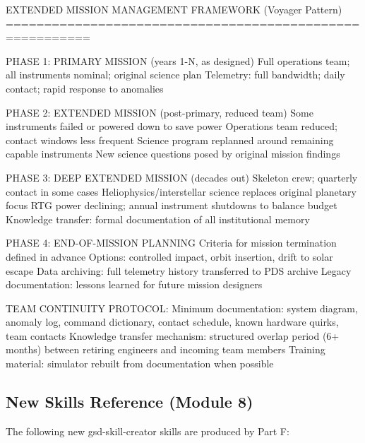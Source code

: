 \documentclass[11pt,letterpaper]{article}
\begin{document}
\begin{asciibox}
EXTENDED MISSION MANAGEMENT FRAMEWORK (Voyager Pattern)
=========================================================

PHASE 1: PRIMARY MISSION (years 1-N, as designed)
  Full operations team; all instruments nominal; original science plan
  Telemetry: full bandwidth; daily contact; rapid response to anomalies

PHASE 2: EXTENDED MISSION (post-primary, reduced team)
  Some instruments failed or powered down to save power
  Operations team reduced; contact windows less frequent
  Science program replanned around remaining capable instruments
  New science questions posed by original mission findings

PHASE 3: DEEP EXTENDED MISSION (decades out)
  Skeleton crew; quarterly contact in some cases
  Heliophysics/interstellar science replaces original planetary focus
  RTG power declining; annual instrument shutdowns to balance budget
  Knowledge transfer: formal documentation of all institutional memory

PHASE 4: END-OF-MISSION PLANNING
  Criteria for mission termination defined in advance
  Options: controlled impact, orbit insertion, drift to solar escape
  Data archiving: full telemetry history transferred to PDS archive
  Legacy documentation: lessons learned for future mission designers

TEAM CONTINUITY PROTOCOL:
  Minimum documentation: system diagram, anomaly log, command dictionary,
  contact schedule, known hardware quirks, team contacts
  Knowledge transfer mechanism: structured overlap period (6+ months)
  between retiring engineers and incoming team members
  Training material: simulator rebuilt from documentation when possible
\end{asciibox}

\subsection{New Skills Reference (Module 8)}

The following new gsd-skill-creator skills are produced by Part F:
\end{document}
